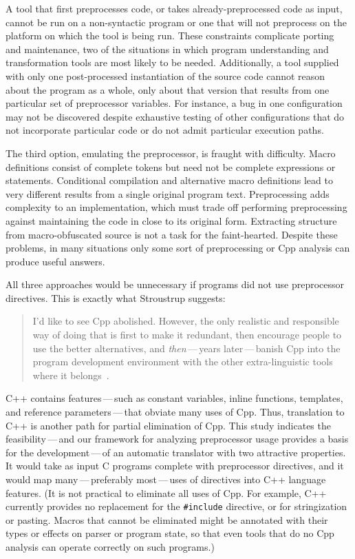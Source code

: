 \documentclass[11pt]{article}
\begin{document}
A tool that first preprocesses code, or takes already-preprocessed code as
input, cannot be run on a non-syntactic program or one that will not
preprocess on the platform on which the tool is being run.  These
constraints complicate porting and maintenance, two of the situations in
which program understanding and transformation tools are most likely to be
needed.  Additionally, a tool supplied with only one post-processed
instantiation of the source code cannot reason about the program as a
whole, only about that version that results from one particular set of
preprocessor variables.  For instance, a bug in one configuration may not
be discovered despite exhaustive testing of other configurations that do
not incorporate particular code or do not admit particular execution paths.

The third option, emulating the preprocessor, is fraught with difficulty.
Macro definitions consist of complete tokens but need not be complete
expressions or statements.  Conditional compilation and alternative macro
definitions lead to very different results from a single original program
text.  Preprocessing adds complexity to an implementation, which must trade
off performing preprocessing against maintaining the code in close to its
original form.  Extracting structure from macro-obfuscated source is not a
task for the faint-hearted.  Despite these problems, in many situations
only some sort of preprocessing or Cpp analysis can produce useful answers.

All three approaches would be unnecessary if programs did not use
preprocessor directives.  This is exactly what Stroustrup suggests:
\begin{quote}
  I'd like to see Cpp abolished.  However, the only realistic and
  responsible way of doing that is first to make it redundant, then
  encourage people to use the better alternatives, and {\em then\/}\,---\,years
  later\,---\,banish Cpp into the program development environment with the
  other extra-linguistic tools where it
  belongs~\cite[p.~426]{Stroustrup-DesignEvolution}.
\end{quote}
C++ contains features\,---\,such as constant variables, inline functions,
templates, and reference parameters\,---\,that obviate many uses of Cpp.
Thus, translation to C++ is another path for partial elimination of Cpp.
This study indicates the
feasibility\,---\,and our framework for analyzing preprocessor usage
provides a basis for the development\,---\,of an automatic translator with
two attractive properties.  It would take as input C programs complete with
preprocessor directives, and it would map many\,---\,preferably
most\,---\,uses of directives into C++ language features.  (It is not
practical to eliminate all uses of Cpp.  For example, C++ currently
provides no replacement for the {\tt \#include} directive, or for
stringization or pasting.  Macros that cannot be eliminated might be
annotated with their types or 
effects on parser or program state, so that even tools that do no Cpp
analysis can operate correctly on such programs.)
\end{document}
